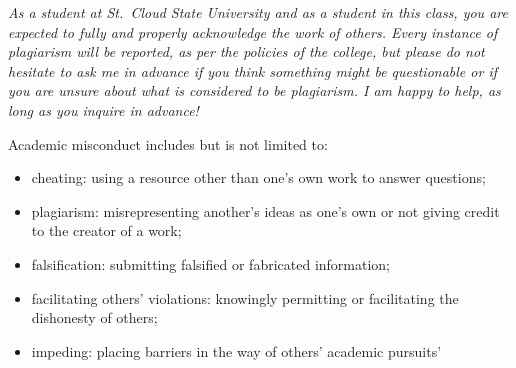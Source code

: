 \documentclass{tufte-handout}
\begin{document}
\begin{fullwidth}

\emph{As a student at St.\ Cloud State University and as a student in this class, you are expected to fully and properly acknowledge the work of others. Every instance of plagiarism will be reported, as per the policies of the college, but please do not hesitate to ask me in advance if you think something might be questionable or if you are unsure about what is considered to be plagiarism. I am happy to help, as long as you inquire in advance! }

Academic misconduct includes but is not limited to:

\begin{itemize}
	\item cheating: using a resource other than one's own work to answer questions;
	\item plagiarism: misrepresenting another's ideas as one's own or not giving credit to the creator of a work;
	\item falsification: submitting falsified or fabricated information;
	\item facilitating others' violations: knowingly permitting or facilitating the dishonesty of others;
	\item impeding: placing barriers in the way of others' academic pursuits'
\end{itemize}


\end{fullwidth}



\end{document}

